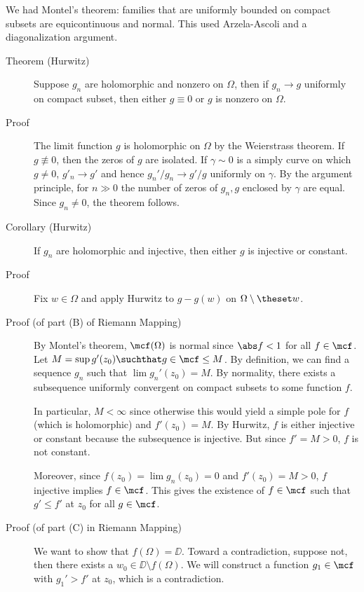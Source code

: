 We had Montel's theorem: families that are uniformly bounded on compact
subsets are equicontinuous and normal. This used Arzela-Ascoli and a
diagonalization argument.

\begin{description}
\item[Theorem (Hurwitz)]
Suppose \(g_n\) are holomorphic and nonzero on \(\Omega\), then if
\(g_n \to g\) uniformly on compact subset, then either \(g \equiv 0\) or
\(g\) is nonzero on \(\Omega\).
\item[Proof]
The limit function \(g\) is holomorphic on \(\Omega\) by the Weierstrass
theorem. If \(g\not\equiv 0\), then the zeros of \(g\) are isolated. If
\(\gamma \sim 0\) is a simply curve on which \(g\neq 0\),
\(g'_n \to g'\) and hence \(g_n' / g_n \to g'/g\) uniformly on
\(\gamma\). By the argument principle, for \(n\gg 0\) the number of
zeros of \(g_n, g\) enclosed by \(\gamma\) are equal. Since
\(g_n \neq 0\), the theorem follows.
\item[Corollary (Hurwitz)]
If \(g_n\) are holomorphic and injective, then either \(g\) is injective
or constant.
\item[Proof]
Fix \(w\in \Omega\) and apply Hurwitz to \(g - g(w)\) on
\(\Omega \setminus \theset w\).
\item[Proof (of part (B) of Riemann Mapping)]
By Montel's theorem, \(\mcf(\Omega)\) is normal since \(\abs f < 1\) for
all \(f\in \mcf\). Let \(M = \sup{g'(z_0) \suchthat g\in \mcf} \leq M\).
By definition, we can find a sequence \(g_n\) such that
\(\lim g_n'(z_0) = M\). By normality, there exists a subsequence
uniformly convergent on compact subsets to some function \(f\).

\hfill\break

In particular, \(M < \infty\) since otherwise this would yield a simple
pole for \(f\) (which is holomorphic) and \(f'(z_0) = M\). By Hurwitz,
\(f\) is either injective or constant because the subsequence is
injective. But since \(f' = M > 0\), \(f\) is not constant.

\hfill\break

Moreover, since \(f(z_0) = \lim g_n(z_0) = 0\) and \(f'(z_0) = M > 0\),
\(f\) injective implies \(f\in \mcf\). This gives the existence of
\(f\in\mcf\) such that \(g' \leq f'\) at \(z_0\) for all \(g\in \mcf\).
\item[Proof (of part (C) in Riemann Mapping)]
We want to show that \(f(\Omega) = \DD\). Toward a contradiction,
suppose not, then there exists a \(w_0 \in \DD \setminus f(\Omega)\). We
will construct a function \(g_1 \in \mcf\) with \(g_1' > f'\) at
\(z_0\), which is a contradiction.


\end{description}
